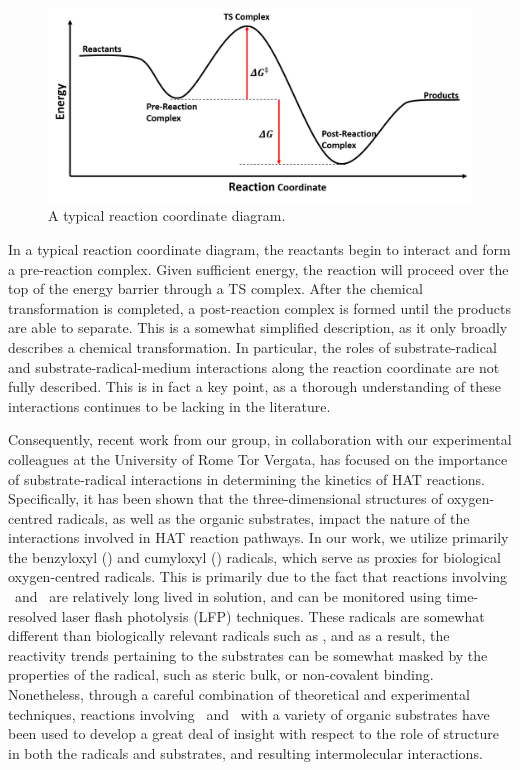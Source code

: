 \begin{figure}[htb]
  \centering
  \includegraphics[width=\textwidth]{figures/pes}
  \caption[A typical reaction coordinate diagram.]{A typical reaction
  coordinate diagram.}
\label{fig:pes}
\end{figure}

In a typical reaction coordinate diagram, the reactants begin to interact and
form a pre-reaction complex. Given sufficient energy, the reaction will proceed
over the top of the energy barrier through a TS complex. After the chemical
transformation is completed, a post-reaction complex is formed until the
products are able to separate. This is a somewhat simplified description, as it
only broadly describes a chemical transformation. In particular, the roles of
substrate-radical and substrate-radical-medium interactions along the reaction
coordinate are not fully described. This is in fact a key point, as a thorough
understanding of these interactions continues to be lacking in the literature.

Consequently, recent work from our group, in collaboration with our experimental
colleagues at the University of Rome Tor Vergata, has focused on the importance
of substrate-radical interactions in determining the kinetics of HAT reactions.
Specifically, it has been shown that the three-dimensional structures of
oxygen-centred radicals, as well as the organic substrates, impact the nature of
the interactions involved in HAT reaction pathways.\cite{Salamone2015Rev} In our
work, we utilize primarily the benzyloxyl (\bno) and cumyloxyl (\cumo) radicals,
which serve as proxies for biological oxygen-centred radicals. This is primarily
due to the fact that reactions involving \bno\ and \cumo\ are relatively long
lived in solution, and can be monitored using time-resolved laser flash
photolysis (LFP) techniques. These radicals are somewhat different than
biologically relevant radicals such as , and as a result, the
reactivity trends pertaining to the substrates can be somewhat masked by the
properties of the radical, such as steric bulk,\cite{Finn2004} or non-covalent
binding.\cite{Salamone2011b} Nonetheless, through a careful combination of
theoretical and experimental techniques, reactions involving \bno\ and \cumo\
with a variety of organic substrates have been used to develop a great deal of
insight with respect to the role of structure in both the radicals and
substrates, and resulting intermolecular interactions.

